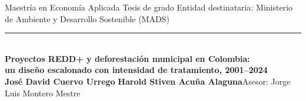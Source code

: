 \documentclass[final,t]{beamer}
\begin{document}
\begin{frame}[t]{}

\begin{tcolorbox}[colback=dosel,colframe=dosel,boxrule=0pt,sharp corners,
  left=0.999cm,right=0.999cm,top=0.832cm,bottom=0.832cm]
  {\color{papel!70}\normalsize Maestría en Economía Aplicada \quad\textbullet\quad Tesis de grado
   \hfill Entidad destinataria: Ministerio de Ambiente y Desarrollo Sostenible (MADS)}\\[0.25cm]
  {\color{papel!40}\rule{\linewidth}{1pt}}\\[0.499cm]
  {\color{papel}\fontsize{60}{67}\selectfont\bfseries
   Proyectos REDD+ y deforestación municipal en Colombia:}\\[0.291cm]
  {\color{papel!80}\fontsize{42}{48}\selectfont\bfseries
   un diseño escalonado con intensidad de tratamiento, 2001--2024}\\[0.583cm]
  {\color{papel!85}\large\textbf{José David Cuervo Urrego}\quad\textbullet\quad
   \textbf{Harold Stiven Acuña Alaguna}\qquad Asesor: Jorge Luis Montero Mestre}
\end{tcolorbox}




\end{frame}
\end{document}

